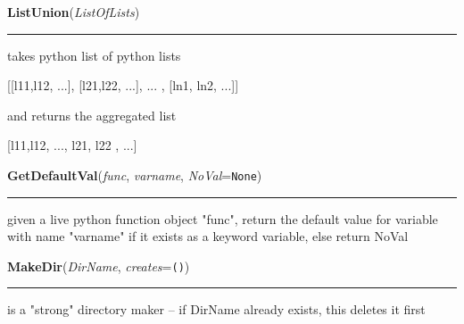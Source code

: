     \label{System:Utils:ListUnion}

    \vspace{0.5ex}

\hspace{.8\funcindent}\begin{boxedminipage}{\funcwidth}

    \raggedright \textbf{ListUnion}(\textit{ListOfLists})

    \vspace{-1.5ex}

    \rule{\textwidth}{0.5\fboxrule}
\setlength{\parskip}{2ex}
    takes python list of python lists

    [[l11,l12, ...], [l21,l22, ...], ... , [ln1, ln2, ...]]

    and returns the aggregated list

    [l11,l12, ..., l21, l22 , ...]

\setlength{\parskip}{1ex}
    \end{boxedminipage}

    \label{System:Utils:GetDefaultVal}

    \vspace{0.5ex}

\hspace{.8\funcindent}\begin{boxedminipage}{\funcwidth}

    \raggedright \textbf{GetDefaultVal}(\textit{func}, \textit{varname}, \textit{NoVal}={\tt None})

    \vspace{-1.5ex}

    \rule{\textwidth}{0.5\fboxrule}
\setlength{\parskip}{2ex}
    given a live python function object "func", return the default value 
    for variable with name "varname" if it exists as a keyword variable, 
    else return NoVal

\setlength{\parskip}{1ex}
    \end{boxedminipage}

    \label{System:Utils:MakeDir}

    \vspace{0.5ex}

\hspace{.8\funcindent}\begin{boxedminipage}{\funcwidth}

    \raggedright \textbf{MakeDir}(\textit{DirName}, \textit{creates}={\tt ()})

    \vspace{-1.5ex}

    \rule{\textwidth}{0.5\fboxrule}
\setlength{\parskip}{2ex}
    is a "strong" directory maker -- if DirName already exists, this 
    deletes it first

\setlength{\parskip}{1ex}
    \end{boxedminipage}

